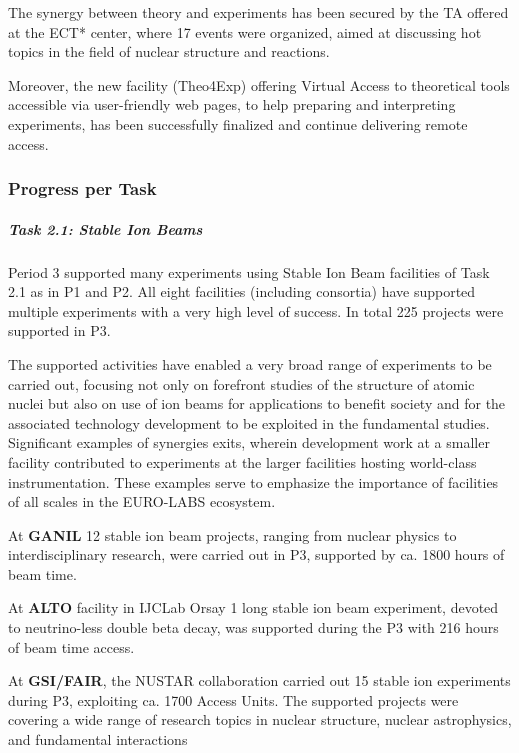 The synergy between theory and experiments has been secured by the TA offered at the ECT* center, where 17 events were organized, aimed at 
discussing hot topics in the field of nuclear structure and reactions. 




Moreover, the new facility (Theo4Exp) offering Virtual Access to theoretical tools accessible via user-friendly web pages, to help preparing and interpreting experiments, has been successfully finalized and continue delivering remote access.


\subsubsection*{Progress per Task}
\subparagraph{Task 2.1: Stable Ion Beams} \mbox{}




Period 3 supported many experiments using  Stable Ion Beam facilities of Task 2.1 as in P1 and P2. All eight facilities (including consortia) have supported multiple experiments with a very high level of success. In total 225 projects were supported in P3.



The supported activities have enabled a very broad range of experiments to be carried out, focusing not only on forefront studies of the structure of atomic nuclei but also on use of ion beams for applications to benefit society and for the associated technology  development to be exploited in the fundamental studies. Significant examples of synergies exits, wherein development work at a smaller facility contributed to experiments at the larger facilities hosting world-class instrumentation. These examples serve to emphasize the importance of facilities of all scales in the EURO-LABS ecosystem.


At \textbf{GANIL} 12 stable ion beam projects, ranging from nuclear physics to interdisciplinary research, were carried out in P3, supported by ca. 1800 hours of beam time. 

At \textbf{ALTO} facility in IJCLab Orsay 1 long stable ion beam experiment, devoted to neutrino-less double beta decay, was supported during the P3 with 216 hours of beam time access. 

At \textbf{GSI/FAIR}, the NUSTAR collaboration carried out 15 stable ion experiments during P3, exploiting ca. 1700 Access Units.  The supported projects were covering a wide range of research topics in nuclear structure, nuclear astrophysics, and fundamental interactions

